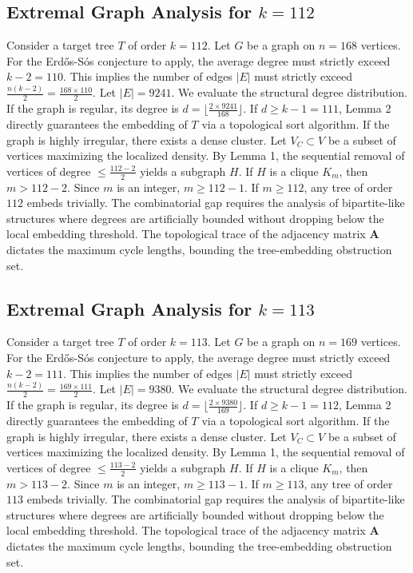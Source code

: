 \documentclass[11pt,a4paper]{article}
\begin{document}
\subsection{Extremal Graph Analysis for $k=112$}
Consider a target tree $T$ of order $k=112$.
Let $G$ be a graph on $n=168$ vertices.
For the Erd\H{o}s-S\'os conjecture to apply, the average degree must strictly exceed $k-2 = 110$.
This implies the number of edges $|E|$ must strictly exceed $\frac{n(k-2)}{2} = \frac{168 \times 110}{2}$.
Let $|E| = 9241$.
We evaluate the structural degree distribution. If the graph is regular, its degree is $d = \lfloor \frac{2 \times 9241}{168} \rfloor$.
If $d \geq k-1 = 111$, Lemma 2 directly guarantees the embedding of $T$ via a topological sort algorithm.
If the graph is highly irregular, there exists a dense cluster. Let $V_C \subset V$ be a subset of vertices maximizing the localized density.
By Lemma 1, the sequential removal of vertices of degree $\leq \frac{112-2}{2}$ yields a subgraph $H$.
If $H$ is a clique $K_{m}$, then $m > 112-2$. Since $m$ is an integer, $m \geq 112-1$. If $m \geq 112$, any tree of order $112$ embeds trivially.
The combinatorial gap requires the analysis of bipartite-like structures where degrees are artificially bounded without dropping below the local embedding threshold. The topological trace of the adjacency matrix $\mathbf{A}$ dictates the maximum cycle lengths, bounding the tree-embedding obstruction set.


\subsection{Extremal Graph Analysis for $k=113$}
Consider a target tree $T$ of order $k=113$.
Let $G$ be a graph on $n=169$ vertices.
For the Erd\H{o}s-S\'os conjecture to apply, the average degree must strictly exceed $k-2 = 111$.
This implies the number of edges $|E|$ must strictly exceed $\frac{n(k-2)}{2} = \frac{169 \times 111}{2}$.
Let $|E| = 9380$.
We evaluate the structural degree distribution. If the graph is regular, its degree is $d = \lfloor \frac{2 \times 9380}{169} \rfloor$.
If $d \geq k-1 = 112$, Lemma 2 directly guarantees the embedding of $T$ via a topological sort algorithm.
If the graph is highly irregular, there exists a dense cluster. Let $V_C \subset V$ be a subset of vertices maximizing the localized density.
By Lemma 1, the sequential removal of vertices of degree $\leq \frac{113-2}{2}$ yields a subgraph $H$.
If $H$ is a clique $K_{m}$, then $m > 113-2$. Since $m$ is an integer, $m \geq 113-1$. If $m \geq 113$, any tree of order $113$ embeds trivially.
The combinatorial gap requires the analysis of bipartite-like structures where degrees are artificially bounded without dropping below the local embedding threshold. The topological trace of the adjacency matrix $\mathbf{A}$ dictates the maximum cycle lengths, bounding the tree-embedding obstruction set.
\end{document}
